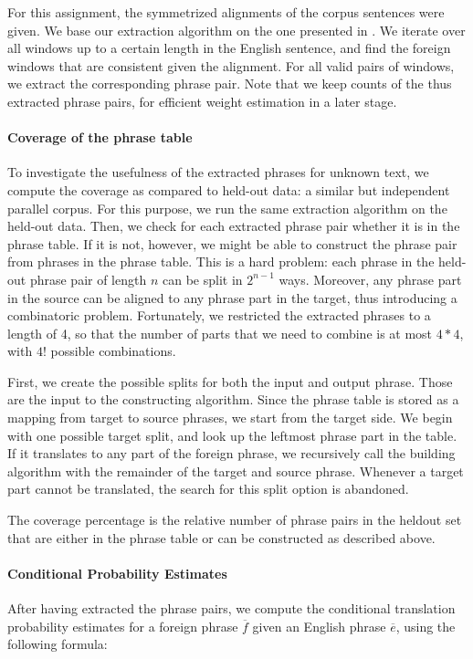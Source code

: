 \documentclass[11pt]{article}
\begin{document}
For this assignment, the symmetrized alignments of the corpus sentences were given. 
We base our extraction algorithm on the one presented in \cite[page 133]{Koehn:2010}.
We iterate over all windows up to a certain length in the English sentence, and find the foreign windows that are consistent given the alignment. For all valid pairs of windows, we extract the corresponding phrase pair. Note that we keep counts of the thus extracted phrase pairs, for efficient weight estimation in a later stage.

\paragraph{Coverage of the phrase table}
To investigate the usefulness of the extracted phrases for unknown text, we compute the coverage as compared to held-out data: a similar but independent parallel corpus. For this purpose, we run the same extraction algorithm on the held-out data. Then, we check for each extracted phrase pair whether it is in the phrase table. If it is not, however, we might be able to construct the phrase pair from phrases in the phrase table. This is a hard problem: each phrase in the held-out phrase pair of length $n$ can be split in $2^{n-1}$ ways. Moreover, any phrase part in the source can be aligned to any phrase part in the target, thus introducing a combinatoric problem. Fortunately, we restricted the extracted phrases to a length of 4, so that the number of parts that we need to combine is at most $4*4$, with $4!$ possible combinations.


 First, we create the possible splits for both the input and output phrase. Those are the input to the constructing algorithm.
Since the phrase table is stored as a mapping from target to source phrases, we start from the target side. 
We begin with one possible target split, and look up the leftmost phrase part in the table. If it translates to any part of the foreign phrase, we recursively call the building algorithm with the remainder of the target and source phrase. Whenever a target part cannot be translated, the search for this split option is abandoned. 

The coverage percentage is the relative number of phrase pairs in the heldout set that are either in the phrase table or can be constructed as described above.


\paragraph{Conditional Probability Estimates}
After having extracted the phrase pairs, we compute the conditional translation probability estimates for a foreign phrase $\overline{f}$ given an English phrase $\overline{e}$, using the following formula:
\end{document}
